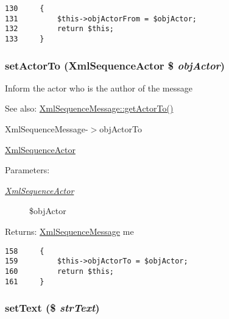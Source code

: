 \begin{Code}\begin{verbatim}130     {
131         $this->objActorFrom = $objActor;
132         return $this;
133     }
\end{verbatim}
\end{Code}


\hypertarget{class_xml_sequence_message_92a0fddd1153a2fe01e9715ceb5233c0}{
\subsubsection[{setActorTo}]{\setlength{\rightskip}{0pt plus 5cm}setActorTo ({\bf XmlSequenceActor} \$ {\em objActor})}}
\label{class_xml_sequence_message_92a0fddd1153a2fe01e9715ceb5233c0}


Inform the actor who is the author of the message

\begin{Desc}
\item[See also:]\hyperlink{class_xml_sequence_message_63824a7a88f53de045b4d2d641594e7e}{XmlSequenceMessage::getActorTo()} 

XmlSequenceMessage-$>$objActorTo 

\hyperlink{class_xml_sequence_actor}{XmlSequenceActor} \end{Desc}
\begin{Desc}
\item[Parameters:]
\begin{description}
\item[{\em \hyperlink{class_xml_sequence_actor}{XmlSequenceActor}}]\$objActor \end{description}
\end{Desc}
\begin{Desc}
\item[Returns:]\hyperlink{class_xml_sequence_message}{XmlSequenceMessage} me \end{Desc}


\begin{Code}\begin{verbatim}158     {
159         $this->objActorTo = $objActor;
160         return $this;
161     }
\end{verbatim}
\end{Code}


\hypertarget{class_xml_sequence_message_26924a5809fc46179731c63cdef4637f}{
\subsubsection[{setText}]{\setlength{\rightskip}{0pt plus 5cm}setText (\$ {\em strText})}}
\label{class_xml_sequence_message_26924a5809fc46179731c63cdef4637f}


